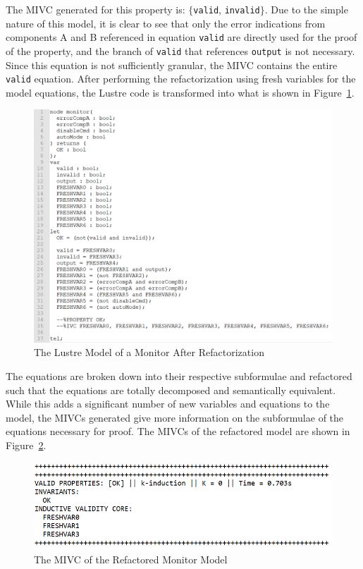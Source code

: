 The MIVC generated for this property is: $\{$\texttt{valid}, \texttt{invalid}$\}$. Due to the simple nature of this model, it is clear to see that only the error indications from components A and B referenced in equation \texttt{valid} are directly used for the proof of the property, and the branch of \texttt{valid} that references \texttt{output} is not necessary. Since this equation is not sufficiently granular, the MIVC contains the entire \texttt{valid} equation. After performing the refactorization using fresh variables for the model equations, the Lustre code is transformed into what is shown in Figure~\ref{fig:monitorFreshLustre}. 
\begin{figure}[h!]
\begin{center}
\includegraphics[width=.8\textwidth]{images/monitorFreshLustre.PNG}
\caption{The Lustre Model of a Monitor After Refactorization} \label{fig:monitorFreshLustre}
\end{center}
\end{figure} 

The equations are broken down into their respective subformulae and refactored such that the equations are totally decomposed and semantically equivalent. While this adds a significant number of new variables and equations to the model, the MIVCs generated give more information on the subformulae of the equations necessary for proof. The MIVCs of the refactored model are shown in Figure~\ref{fig:monitorFreshIVCs}. 
\begin{figure}[h!]
\begin{center}
\includegraphics[width=.6\textwidth]{images/monitorFreshIVCs.PNG}
\caption{The MIVC of the Refactored Monitor Model} \label{fig:monitorFreshIVCs}
\end{center}
\end{figure} 

